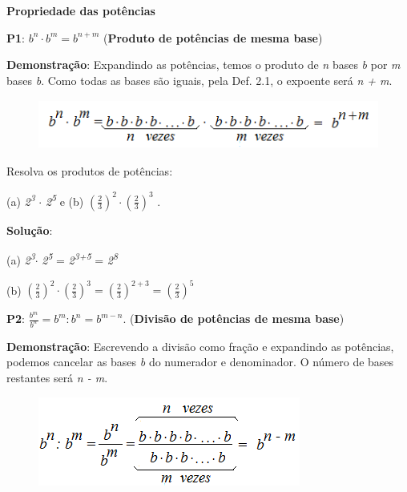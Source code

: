 \textbf{Propriedade das potências}

\begin{caixa}
\textbf{P1}: $b^n \cdot b^m = b^{n+m}$ (\textbf{Produto de potências de mesma base})
\end{caixa}

\textbf{Demonstração}: Expandindo as potências, temos o produto de \textit{n} bases \textit{b} por \textit{m} bases \textit{b}. Como todas as bases são iguais, pela Def. 2.1, o expoente será \textit{n + m}.

\begin{figure}[H]
	\begin{Center}
		\includegraphics[width=4.61in,height=0.64in]{capitulos/potencias_e_funcoes_exponenciais/media/image3.png}
	\end{Center}
\end{figure}

\qedsymbol{}

\begin{texemplo}
Resolva os produtos de potências: 

 (a)  \textit{2\textsuperscript{3}} $ \cdot $  \textit{2\textsuperscript{5}}   e   (b)  \(  \left( \frac{2}{3} \right) ^{2} \cdot  \left( \frac{2}{3} \right) ^{3} \) .

\textbf{Solução}: 

(a) \textit{2\textsuperscript{3}}$ \cdot $   \textit{2\textsuperscript{5}} = \textit{2\textsuperscript{3+5}} = \textit{2\textsuperscript{8}} 

(b)  \(  \left( \frac{2}{3} \right) ^{2} \cdot  \left( \frac{2}{3} \right) ^{3}= \left( \frac{2}{3} \right) ^{2+3}= \left( \frac{2}{3} \right) ^{5} \)  \qedsymbol{}
\end{texemplo}

\begin{caixa}
\textbf{P2}: \( \frac{b^{m}}{b^{n}}=b^{m}: b^{n}=b^{m-n} \). (\textbf{Divisão de potências de mesma base})
\end{caixa}

\textbf{Demonstração}: Escrevendo a divisão como fração e expandindo as potências, podemos cancelar as bases \textit{b} do numerador e denominador. O número de bases restantes será \textit{n - m}.

\begin{figure}[H]
			\includegraphics[width=3.4in,height=1.15in]{capitulos/potencias_e_funcoes_exponenciais/media/image4.png}
	\end{figure}

